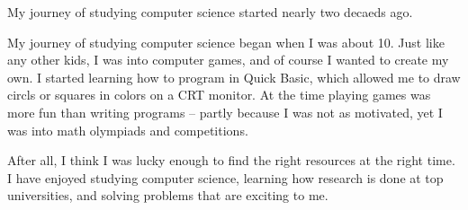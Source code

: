 
My journey of studying computer science started nearly two decaeds ago.



My journey of studying computer science began when I was about 10.
Just like any other kids, I was into computer games, and of course I wanted to create my own. 
I started learning how to program in Quick Basic, which allowed me to draw circls or squares in colors on a CRT monitor.
At the time playing games was more fun than writing programs -- partly because I was not as motivated, yet I was into math olympiads and competitions.




After all, I think I was lucky enough to find the right resources at the right time.  I have enjoyed studying computer science, learning how research is done at top universities, and solving problems that are exciting to me.


